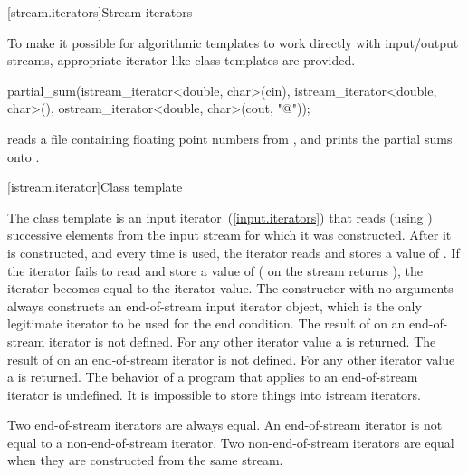 [stream.iterators]{Stream iterators}

\pnum
To make it possible for algorithmic templates to work directly with input/output streams, appropriate
iterator-like
class templates
are provided.

\enterexample
\begin{codeblock}
partial_sum(istream_iterator<double, char>(cin),
  istream_iterator<double, char>(),
  ostream_iterator<double, char>(cout, "@\textbackslash@n"));
\end{codeblock}

reads a file containing floating point numbers from
,
and prints the partial sums onto
.
\exitexample

[istream.iterator]{Class template }

\pnum
{}%
The class template
is an input iterator~(\ref{input.iterators}) that
reads (using
)
successive elements from the input stream for which it was constructed.
After it is constructed, and every time
\tcode{++}
is used, the iterator reads and stores a value of
.
If the iterator fails to read and store a value of 
(
on the stream returns
),
the iterator becomes equal to the
iterator value.
The constructor with no arguments
always constructs
an end-of-stream input iterator object, which is the only legitimate iterator to be used
for the end condition.
The result of
on an end-of-stream iterator is not defined.
For any other iterator value a
is returned.
The result of
on an end-of-stream iterator is not defined.
For any other iterator value a
is returned.
The behavior of a program that applies  to an end-of-stream
iterator is undefined.
It is impossible to store things into istream iterators.

\pnum
Two end-of-stream iterators are always equal.
An end-of-stream iterator is not
equal to a non-end-of-stream iterator.
Two non-end-of-stream iterators are equal when they are constructed from the same stream.


